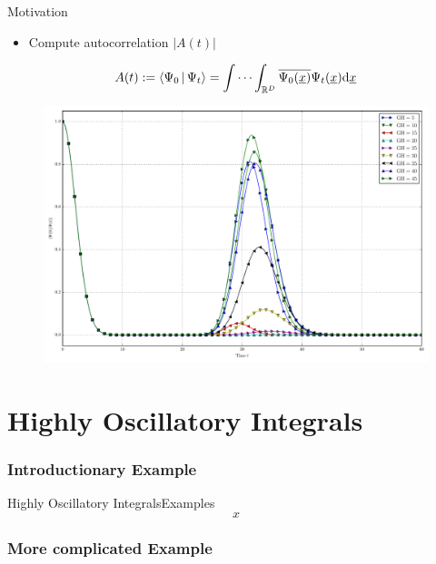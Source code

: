 \documentclass{beamer}
\begin{document}
\begin{frame}{Motivation}
  \begin{itemize}
    \item Compute autocorrelation $|A(t)|$
  \end{itemize}
  \vspace{0.2cm}
  \begin{equation*}
    A(t) := \Braket{\Psi_0 | \Psi_t}
         = \idotsint_{\mathbb{R}^D} \overline{\Psi_0(\underline{x})} \Psi_t(\underline{x}) \mathrm{d}\underline{x}
  \end{equation*}
  \begin{figure}
    \centering
    \includegraphics[width=0.7\linewidth]{./fig/ac_mercurial_morse.pdf}
  \end{figure}
\end{frame}


\section{Highly Oscillatory Integrals}
\subsubsection{Introductionary Example}



\begin{frame}{Highly Oscillatory Integrals}{Examples}
  \begin{equation}
    x
  \end{equation}
\end{frame}



\subsubsection{More complicated Example}

\end{document}

